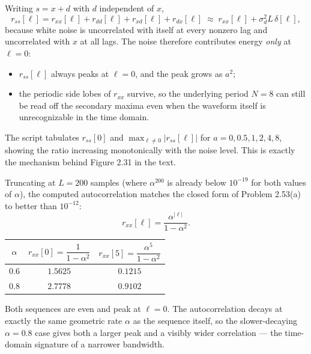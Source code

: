 Writing $s=x+d$ with $d$ independent of $x$,
\[
r_{ss}[\ell]=r_{xx}[\ell]+r_{dd}[\ell]+r_{xd}[\ell]+r_{dx}[\ell]
\;\approx\; r_{xx}[\ell]+\sigma_d^{2}L\,\delta[\ell],
\]
because white noise is uncorrelated with itself at every nonzero lag and uncorrelated with
$x$ at all lags. The noise therefore contributes energy \emph{only} at $\ell=0$:
\begin{itemize}[leftmargin=1.4em,itemsep=1pt]
\item $r_{ss}[\ell]$ always peaks at $\ell=0$, and the peak grows as $a^{2}$;
\item the periodic side lobes of $r_{xx}$ survive, so the underlying period $N=8$ can still be
      read off the secondary maxima even when the waveform itself is unrecognizable in the
      time domain.
\end{itemize}
The script tabulates $r_{ss}[0]$ and $\max_{\ell\ne0}|r_{ss}[\ell]|$ for
$a=0,0.5,1,2,4,8$, showing the ratio increasing monotonically with the noise level.
This is exactly the mechanism behind Figure 2.31 in the text.


Truncating at $L=200$ samples (where $\alpha^{200}$ is already below $10^{-19}$ for both
values of $\alpha$), the computed autocorrelation matches the closed form of Problem 2.53(a)
to better than $10^{-12}$:
\[
r_{xx}[\ell]=\frac{\alpha^{|\ell|}}{1-\alpha^{2}} .
\]
\begin{center}
\renewcommand{\arraystretch}{1.2}
\begin{tabular}{@{}ccc@{}}
\toprule
$\alpha$ & $r_{xx}[0]=\dfrac{1}{1-\alpha^{2}}$ & $r_{xx}[5]=\dfrac{\alpha^{5}}{1-\alpha^{2}}$\\
\midrule
$0.6$ & $1.5625$ & $0.1215$\\
$0.8$ & $2.7778$ & $0.9102$\\
\bottomrule
\end{tabular}
\end{center}
Both sequences are even and peak at $\ell=0$. The autocorrelation decays at exactly the same
geometric rate $\alpha$ as the sequence itself, so the slower-decaying $\alpha=0.8$ case gives
both a larger peak and a visibly wider correlation --- the time-domain signature of a narrower
bandwidth.
